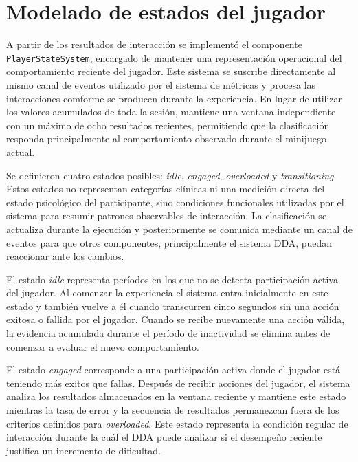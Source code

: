 \section{Modelado de estados del jugador}
A partir de los resultados de interacción se implementó el componente\\
\texttt{PlayerStateSystem}, encargado de mantener una representación operacional
del comportamiento reciente del jugador. Este sistema se suscribe directamente
al mismo canal de eventos utilizado por el sistema de métricas y procesa las
interacciones comforme se producen durante la experiencia. En lugar de utilizar
los valores acumulados de toda la sesión, mantiene una ventana independiente
con un máximo de ocho resultados recientes, permitiendo que la clasificación
responda principalmente al comportamiento observado durante el minijuego actual.

Se definieron cuatro estados posibles: \textit{idle}, \textit{engaged},
\textit{overloaded} y \textit{transitioning}. Estos estados no representan categorías
clínicas ni una medición directa del estado psicológico del participante,
sino condiciones funcionales utilizadas por el sistema para resumir patrones
observables de interacción. La clasificación se actualiza durante la ejecución
y posteriormente se comunica mediante un canal de eventos para que otros
componentes, principalmente el sistema DDA, puedan reaccionar ante los cambios.

El estado \textit{idle} representa períodos en los que no se detecta participación
activa del jugador. Al comenzar la experiencia el sistema entra inicialmente en este estado
y también vuelve a él cuando transcurren cinco segundos sin una acción
exitosa o fallida por el jugador. Cuando se recibe nuevamente una acción 
válida, la evidencia acumulada durante el período de inactividad se 
elimina antes de comenzar a evaluar el nuevo comportamiento. 

El estado \textit{engaged} corresponde a una participación activa donde el
jugador está teniendo más exitos que fallas. Después de recibir acciones del jugador,
el sistema analiza los resultados almacenados en la ventana reciente y
mantiene este estado mientras la tasa de error y la secuencia de resultados
permanezcan fuera de los criterios definidos para \textit{overloaded}. Este
estado representa la condición regular de interacción durante la cuál el DDA
puede analizar si el desempeño reciente justifica un incremento de dificultad.

